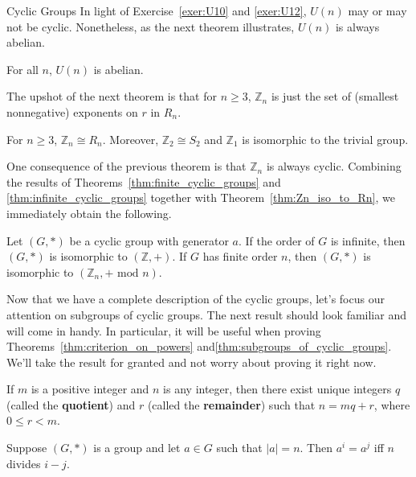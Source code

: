 \begin{section}{Cyclic Groups}
In light of Exercise~\ref{exer:U10} and \ref{exer:U12}, $U(n)$ may or may not be cyclic. Nonetheless, as the next theorem illustrates, $U(n)$ is always abelian.

\begin{theorem}
For all $n$, $U(n)$ is abelian.
\end{theorem}

The upshot of the next theorem is that for $n\geq 3$, $\mathbb{Z}_n$ is just the set of (smallest nonnegative) exponents on $r$ in $R_n$.

\begin{theorem}\label{thm:Zn_iso_to_Rn}
For $n\geq 3$, $\mathbb{Z}_n\cong R_n$. Moreover, $\mathbb{Z}_2\cong S_2$ and $\mathbb{Z}_1$ is isomorphic to the trivial group.
\end{theorem}

One consequence of the previous theorem is that $\mathbb{Z}_n$ is always cyclic. Combining the results of Theorems~\ref{thm:finite_cyclic_groups} and \ref{thm:infinite_cyclic_groups} together with Theorem~\ref{thm:Zn_iso_to_Rn}, we immediately obtain the following.

\begin{theorem}
Let $(G,*)$ be a cyclic group with generator $a$. If the order of $G$ is infinite, then $(G,*)$ is isomorphic to $(\mathbb{Z},+)$. If $G$ has finite order $n$, then $(G,*)$ is isomorphic to $(\mathbb{Z}_n,+\text{ mod }n)$.
\end{theorem}

Now that we have a complete description of the cyclic groups, let's focus our attention on subgroups of cyclic groups.  The next result should look familiar and will come in handy.  In particular, it will be useful when proving Theorems~\ref{thm:criterion_on_powers} and\ref{thm:subgroups_of_cyclic_groups}.  We'll take the result for granted and not worry about proving it right now.

\begin{theorem}
If $m$ is a positive integer and $n$ is any integer, then there exist unique integers $q$ (called the \textbf{quotient}) and $r$ (called the \textbf{remainder}) such that $n=mq+r$, where $0\leq r<m$.
\end{theorem}

\begin{theorem}\label{thm:criterion_on_powers}
Suppose $(G,*)$ is a group and let $a\in G$ such that $|a|=n$.  Then $a^i=a^j$ iff $n$ divides $i-j$.
\end{theorem}


\end{section}
